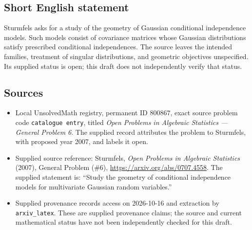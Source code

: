 \documentclass[11pt]{article}
\begin{document}
\subsection{Short English statement}
Sturmfels asks for a study of the geometry of Gaussian conditional independence models. Such models consist of covariance matrices whose Gaussian distributions satisfy prescribed conditional independences. The source leaves the intended families, treatment of singular distributions, and geometric objectives unspecified. Its supplied status is open; this draft does not independently verify that status.
\subsection{Sources}
\begin{itemize}
\item Local UnsolvedMath registry, permanent ID \(800867\), exact source problem code \texttt{catalogue entry}, titled \emph{Open Problems in Algebraic Statistics --- General Problem 6}. The supplied record attributes the problem to Sturmfels, with proposed year 2007, and labels it open.
\item Supplied source reference: Sturmfels, \emph{Open Problems in Algebraic Statistics} (2007), General Problem (\#6), \url{https://arxiv.org/abs/0707.4558}. The supplied statement is: ``Study the geometry of conditional independence models for multivariate Gaussian random variables.''
\item Supplied provenance records access on 2026-10-16 and extraction by \texttt{arxiv\_latex}. These are supplied provenance claims; the source and current mathematical status have not been independently checked for this draft.
\end{itemize}
\end{document}
